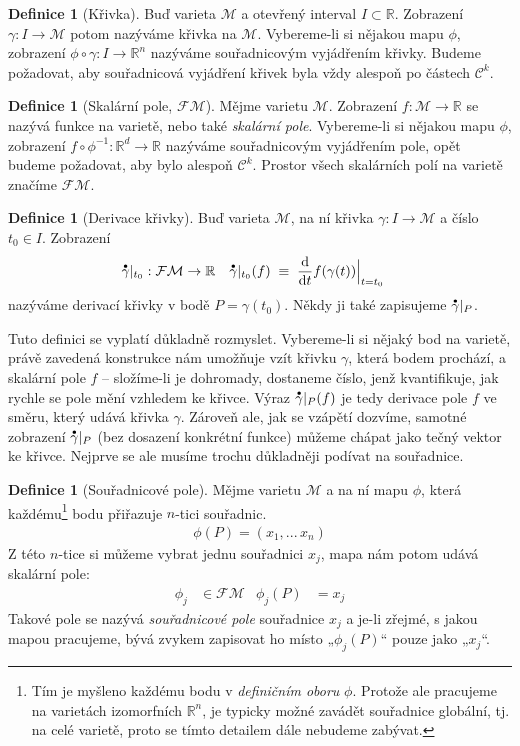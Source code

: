 \documentclass{article}
\theoremstyle{definition}
\newtheorem{definition}[theorem]{Definice}
\newcommand{\const}[1]{\mathrm{#1}}
\newcommand{\dd}[2]{\frac{\const{d} #1}{\const{d} #2}}
\renewcommand{\dot}[1]{\accentset{\bullet}{#1}}
\newcommand{\R}{\mathbb{R}}
\def\Cont{\mathcal{C}}
\def\Manif{\mathcal{M}}
\def\Func{\mathcal{F}}
\begin{document}
\begin{definition}[Křivka]
Buď varieta $\Manif$ a otevřený interval $I \subset \R$. Zobrazení $\gamma: I \to \Manif$ potom nazýváme křivka na $\Manif$. Vybereme-li si nějakou mapu $\phi$, zobrazení $\phi \circ \gamma: I \to \R^n$ nazýváme souřadnicovým vyjádřením křivky. Budeme požadovat, aby souřadnicová vyjádření křivek byla vždy alespoň po částech $\Cont^k$.
\end{definition}

\begin{definition}[Skalární pole, $\Func\Manif$]
Mějme varietu $\Manif$. Zobrazení $f: \Manif \to \R$ se nazývá funkce na varietě, nebo také \textit{skalární pole}. Vybereme-li si nějakou mapu $\phi$, zobrazení $f \circ \phi^{-1}: \R^d \to \R$ nazýváme souřadnicovým vyjádřením pole, opět budeme požadovat, aby bylo alespoň $\Cont^k$. Prostor všech skalárních polí na varietě značíme $\Func\Manif$.
\end{definition}

\begin{definition}[Derivace křivky]
Buď varieta $\Manif$, na ní křivka $\gamma: I \to \Manif$ a číslo $t_0 \in I$. Zobrazení
\begin{align*}
    \dot\gamma|_{t_0} &: \Func\Manif \to \R
    &
    \dot\gamma|_{t_0} (f) \; &\equiv \;
    \dd{}{t} f(\gamma(t)) \Big|_{t = t_0}
\end{align*}
nazýváme derivací křivky v bodě $P=\gamma(t_0)$. Někdy ji také zapisujeme $\dot\gamma|_P$.
\end{definition}

Tuto definici se vyplatí důkladně rozmyslet. Vybereme-li si nějaký bod na varietě, právě zavedená konstrukce nám umožňuje vzít křivku $\gamma$, která bodem prochází, a skalární pole $f$ – složíme-li je dohromady, dostaneme číslo, jenž kvantifikuje, jak rychle se pole mění vzhledem ke křivce. Výraz $\dot\gamma|_P(f)$ je tedy derivace pole $f$ ve směru, který udává křivka $\gamma$. Zároveň ale, jak se vzápětí dozvíme, samotné zobrazení $\dot\gamma|_P$ (bez dosazení konkrétní funkce) můžeme chápat jako tečný vektor ke křivce. Nejprve se ale musíme trochu důkladněji podívat na souřadnice.

\begin{definition}[Souřadnicové pole]
Mějme varietu $\Manif$ a na ní mapu $\phi$, která každému\footnote{Tím je myšleno každému bodu v \textit{definičním oboru} $\phi$. Protože ale pracujeme na varietách izomorfních $\R^n$, je typicky možné zavádět souřadnice globální, tj. na celé varietě, proto se tímto detailem dále nebudeme zabývat.} bodu přiřazuje $n$-tici souřadnic.
\begin{align*}
    \phi(P) = (x_1, ... \, x_n)
\end{align*}
Z této $n$-tice si můžeme vybrat jednu souřadnici $x_j$, mapa nám potom udává skalární pole:
\begin{align*}
    \phi_j &\in \Func\Manif
    &
    \phi_j(P) &= x_j
\end{align*}
Takové pole se nazývá \textit{souřadnicové pole} souřadnice $x_j$ a je-li zřejmé, s jakou mapou pracujeme, bývá zvykem zapisovat ho místo „$\phi_j(P)$“ pouze jako „$x_j$“.
\end{definition}
\end{document}
